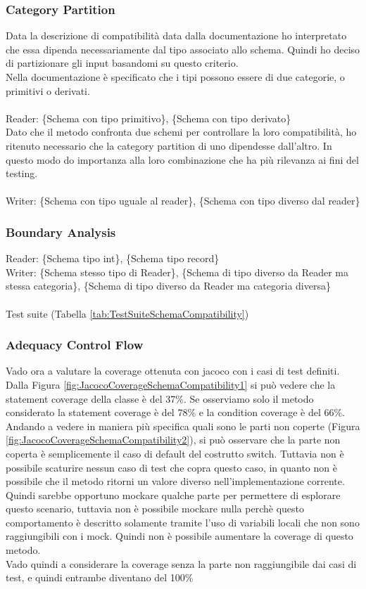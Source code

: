 \documentclass[12pt, a4paper]{article}
\begin{document}
\subsubsection{Category Partition}


Data la descrizione di compatibilità data dalla documentazione ho interpretato che essa dipenda necessariamente dal tipo 
associato allo schema. Quindi ho deciso di partizionare gli input basandomi su questo criterio. \\
Nella documentazione è specificato che i tipi possono essere di due categorie, o primitivi o derivati.\\ \\
Reader: \{Schema con tipo primitivo\}, \{Schema con tipo derivato\} \\
Dato che il metodo confronta due schemi per controllare la loro compatibilità, ho ritenuto necessario che la category partition
di uno dipendesse dall'altro. In questo modo do importanza alla loro combinazione che ha più rilevanza ai fini del testing.\\ \\
Writer: \{Schema con tipo uguale al reader\}, \{Schema con tipo diverso dal reader\}


\subsubsection{Boundary Analysis}

Reader: \{Schema tipo int\}, \{Schema tipo record\} \\
Writer: \{Schema stesso tipo di Reader\}, \{Schema di tipo diverso da Reader ma stessa categoria\}, \{Schema di tipo diverso da Reader ma categoria diversa\} \\ \\
Test suite (Tabella \ref{tab:TestSuiteSchemaCompatibility})

\subsubsection{Adequacy Control Flow}
Vado ora a valutare la coverage ottenuta con jacoco con i casi di test definiti.
Dalla Figura \ref{fig:JacocoCoverageSchemaCompatibility1} si può vedere che la statement coverage della classe è del 37\%.
Se osserviamo solo il metodo considerato la statement coverage è del 78\% e la condition coverage è del 66\%.
Andando a vedere in maniera più specifica quali sono le parti non coperte (Figura \ref{fig:JacocoCoverageSchemaCompatibility2}),
si può osservare che la parte non coperta è semplicemente il caso di default del costrutto switch.
Tuttavia non è possibile scaturire nessun caso di test che copra questo caso, in quanto non è possibile che il metodo
ritorni un valore diverso nell'implementazione corrente. Quindi sarebbe opportuno mockare qualche parte per permettere
di esplorare questo scenario, tuttavia non è possibile mockare nulla perchè questo comportamento è descritto solamente
tramite l'uso di variabili locali che non sono raggiungibili con i mock. Quindi non è possibile aumentare la coverage
di questo metodo. \\
Vado quindi a considerare la coverage senza la parte non raggiungibile dai casi di test, e quindi entrambe diventano del 100\%
\end{document}

